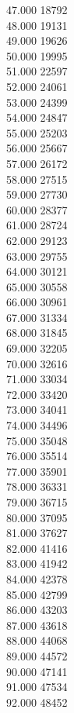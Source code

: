 { 47.000	18792 \\
 48.000	19131 \\
 49.000	19626 \\
 50.000	19995 \\
 51.000	22597 \\
 52.000	24061 \\
 53.000	24399 \\
 54.000	24847 \\
 55.000	25203 \\
 56.000	25667 \\
 57.000	26172 \\
 58.000	27515 \\
 59.000	27730 \\
 60.000	28377 \\
 61.000	28724 \\
 62.000	29123 \\
 63.000	29755 \\
 64.000	30121 \\
 65.000	30558 \\
 66.000	30961 \\
 67.000	31334 \\
 68.000	31845 \\
 69.000	32205 \\
 70.000	32616 \\
 71.000	33034 \\
 72.000	33420 \\
 73.000	34041 \\
 74.000	34496 \\
 75.000	35048 \\
 76.000	35514 \\
 77.000	35901 \\
 78.000	36331 \\
 79.000	36715 \\
 80.000	37095 \\
 81.000	37627 \\
 82.000	41416 \\
 83.000	41942 \\
 84.000	42378 \\
 85.000	42799 \\
 86.000	43203 \\
 87.000	43618 \\
 88.000	44068 \\
 89.000	44572 \\
 90.000	47141 \\
 91.000	47534 \\
 92.000	48452 \\
}
